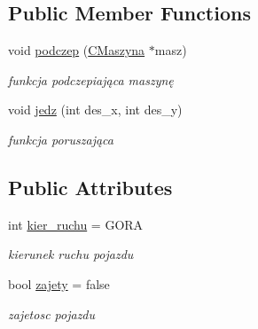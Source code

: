\subsection*{Public Member Functions}
\begin{DoxyCompactItemize}
\item 
\mbox{\label{class_c_pojazd_a6ca2c403d42e94f6de86123afb30f63f}} 
void \mbox{\hyperlink{class_c_pojazd_a6ca2c403d42e94f6de86123afb30f63f}{podczep}} (\mbox{\hyperlink{class_c_maszyna}{C\+Maszyna}} $\ast$masz)
\begin{DoxyCompactList}\small\item\em funkcja podczepiająca maszynę \end{DoxyCompactList}\item 
void \mbox{\hyperlink{class_c_pojazd_ae5b5838c2c769399f73216e02c181c84}{jedz}} (int des\+\_\+x, int des\+\_\+y)
\begin{DoxyCompactList}\small\item\em funkcja poruszająca \end{DoxyCompactList}\end{DoxyCompactItemize}
\subsection*{Public Attributes}
\begin{DoxyCompactItemize}
\item 
\mbox{\label{class_c_pojazd_a775be815b536108353245d8a530b08b8}} 
int \mbox{\hyperlink{class_c_pojazd_a775be815b536108353245d8a530b08b8}{kier\+\_\+ruchu}} = G\+O\+RA
\begin{DoxyCompactList}\small\item\em kierunek ruchu pojazdu \end{DoxyCompactList}\item 
\mbox{\label{class_c_pojazd_a0a1e7b87a4551b76b3f279a14fe043b7}} 
bool \mbox{\hyperlink{class_c_pojazd_a0a1e7b87a4551b76b3f279a14fe043b7}{zajety}} = false
\begin{DoxyCompactList}\small\item\em zajetosc pojazdu \end{DoxyCompactList}\end{DoxyCompactItemize}
